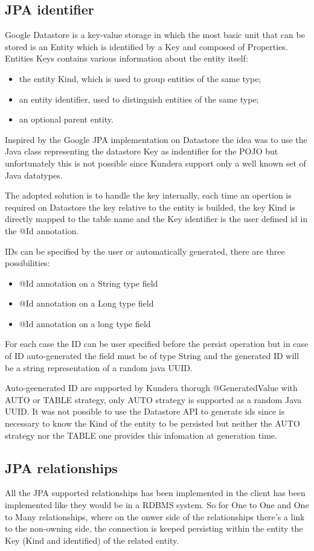 \subsection{JPA identifier}
Google Datastore is a key-value storage in which the most basic unit that can be stored is an Entity which is identified by a Key and composed of Properties.
Entities Keys contains various information about the entity itself:
\begin{itemize}
\item the entity Kind, which is used to group entities of the same type;
\item an entity identifier, used to distinguish entities of the same type;
\item an optional parent entity. 
\end{itemize}
Inspired by the Google JPA implementation on Datastore the idea was to use the Java class representing the datastore Key as indentifier for the POJO but unfortunately this is not possible since Kundera support only a well known set of Java datatypes.

The adopted solution is to handle the key internally, each time an opertion is required on Datastore the key relative to the entity is builded, the key Kind is directly mapped to the table name and the Key identifier is the user defined id in the @Id annotation.

IDs can be specified by the user or automatically generated, there are three possibilities:
\begin{itemize}
\item @Id annotation on a String type field
\item @Id annotation on a Long type field
\item @Id annotation on a long type field
\end{itemize}
For each case the ID can be user specified before the persist operation but in case of ID auto-generated the field must be of type String and the generated ID will be a string representation of a random java UUID.

Auto-geenerated ID are supported by Kundera thorugh @GeneratedValue with AUTO or TABLE strategy, only AUTO strategy is supported as a random Java UUID. It was not possible to use the Datastore API to generate ids since is necessary to know the Kind of the entity to be persisted but neither the AUTO strategy nor the TABLE one provides this infomation at generation time.

\subsection{JPA relationships}
All the JPA supported relationships has been implemented in the client has been implemented like they would be in a RDBMS system.
So for One to One and One to Many relationships, where on the onwer side of the relationships there's a link to the non-owning side, the connection is keeped persisting within the entity the Key (Kind and identified) of the related entity.

